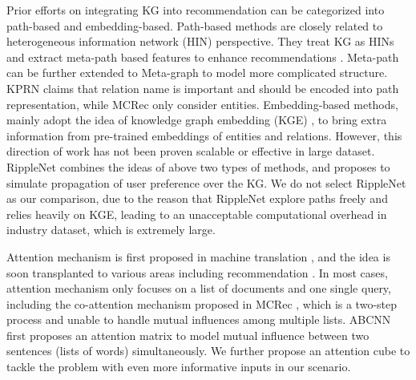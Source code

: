 Prior efforts on integrating KG into recommendation can be categorized into path-based and embedding-based.
Path-based methods are closely related to heterogeneous information network (HIN) perspective. They treat KG as HINs and extract meta-path based features to enhance recommendations \cite{zhao2017meta,gao2018recommendation}. 
Meta-path can be further extended to Meta-graph \cite{zhao2017meta} to model more complicated structure.
KPRN \cite{wang2018explainable} claims that relation name is important and should be encoded into path representation, while MCRec \cite{hu2018leveraging} only consider entities.
Embedding-based methods, mainly adopt the idea of knowledge graph embedding (KGE) \cite{wang2014knowledge,lin2015learning}, to bring extra information from pre-trained embeddings of entities and relations. However, this direction of work has not been proven scalable or effective in large dataset. 
RippleNet \cite{wang2018ripplenet} combines the ideas of above two types of methods, and proposes to simulate propagation of user preference over the KG.
We do not select RippleNet as our comparison,
due to the reason that RippleNet explore paths freely and relies heavily on KGE, leading to an unacceptable computational overhead in industry dataset, which is extremely large.


Attention mechanism is first proposed in machine translation \cite{bahdanau2014neural},
and the idea is soon transplanted to various areas including recommendation \cite{zhou2018deep,wang2017dynamic}.
In most cases, attention mechanism only focuses on a list of documents and one single query, including the co-attention mechanism proposed in MCRec \cite{hu2018leveraging}, which is a two-step process and unable to handle mutual influences among multiple lists. ABCNN \cite{yin2016abcnn} first proposes an attention matrix to model mutual influence between two sentences (lists of words) simultaneously. 
We further propose an attention cube to tackle the problem with even more informative inputs in our scenario.


